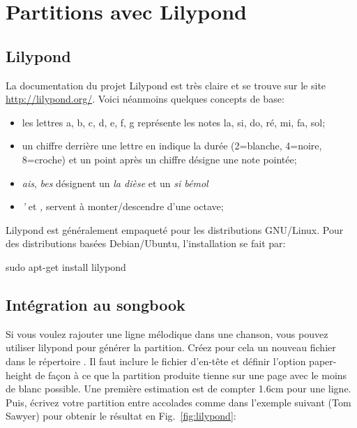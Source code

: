 \documentclass[versionenligne]{patacrep}
\begin{document}
\section{Partitions avec Lilypond}

\subsection{Lilypond}

La documentation du projet Lilypond est très
claire et se trouve sur le site \url{http://lilypond.org/}.
Voici néanmoins quelques concepts de base:

\begin{itemize}
\item les lettres a, b, c, d, e, f, g représente les notes la, si, do,
  ré, mi, fa, sol;
\item un chiffre derrière une lettre en indique la durée (2=blanche, 4=noire,
  8=croche) et un point après un chiffre désigne une note pointée;
\item \emph{ais}, \emph{bes} désignent un \emph{la dièse} et un \emph{si bémol}
\item \emph{'} et \emph{,} servent à monter/descendre d'une octave;
\end{itemize}

Lilypond est généralement empaqueté pour les distributions
GNU/Linux. Pour des distributions basées Debian/Ubuntu, l'installation
se fait par:

\begin{unixcom}
  sudo apt-get install lilypond
\end{unixcom}


\subsection{Intégration au songbook}

Si vous voulez rajouter une ligne mélodique dans une chanson, vous
pouvez utiliser lilypond pour générer la partition. Créez pour cela un
nouveau fichier  dans le répertoire
.  Il faut inclure le fichier d'en-tête
 et définir l'option paper-height de façon à ce que la
partition produite tienne sur une page avec le moins de blanc
possible. Une première estimation est de compter 1.6cm pour une
ligne. Puis, écrivez votre partition entre accolades comme dans
l'exemple suivant (Tom Sawyer) pour obtenir le résultat en
Fig.~\ref{fig:lilypond}:
\end{document}
